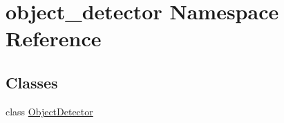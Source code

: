 \hypertarget{namespaceobject__detector}{}\section{object\+\_\+detector Namespace Reference}
\label{namespaceobject__detector}
\subsection*{Classes}
\begin{DoxyCompactItemize}
\item 
class \hyperlink{classobject__detector_1_1ObjectDetector}{Object\+Detector}
\end{DoxyCompactItemize}
